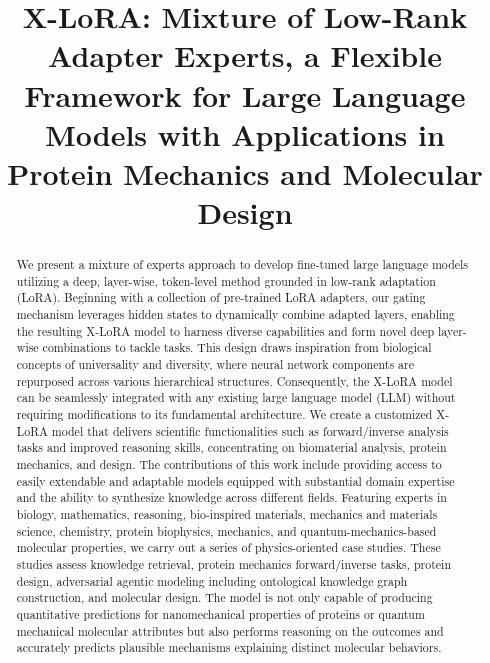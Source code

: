 \title{X-LoRA: Mixture of Low-Rank Adapter Experts, a Flexible Framework for Large Language Models with Applications in Protein Mechanics and Molecular Design}

\begin{abstract}
We present a mixture of experts approach to develop fine-tuned large language models utilizing a deep, layer-wise, token-level method grounded in low-rank adaptation (LoRA). Beginning with a collection of pre-trained LoRA adapters, our gating mechanism leverages hidden states to dynamically combine adapted layers, enabling the resulting X-LoRA model to harness diverse capabilities and form novel deep layer-wise combinations to tackle tasks. This design draws inspiration from biological concepts of universality and diversity, where neural network components are repurposed across various hierarchical structures. Consequently, the X-LoRA model can be seamlessly integrated with any existing large language model (LLM) without requiring modifications to its fundamental architecture. We create a customized X-LoRA model that delivers scientific functionalities such as forward/inverse analysis tasks and improved reasoning skills, concentrating on biomaterial analysis, protein mechanics, and design. The contributions of this work include providing access to easily extendable and adaptable models equipped with substantial domain expertise and the ability to synthesize knowledge across different fields. Featuring experts in biology, mathematics, reasoning, bio-inspired materials, mechanics and materials science, chemistry, protein biophysics, mechanics, and quantum-mechanics-based molecular properties, we carry out a series of physics-oriented case studies. These studies assess knowledge retrieval, protein mechanics forward/inverse tasks, protein design, adversarial agentic modeling including ontological knowledge graph construction, and molecular design. The model is not only capable of producing quantitative predictions for nanomechanical properties of proteins or quantum mechanical molecular attributes but also performs reasoning on the outcomes and accurately predicts plausible mechanisms explaining distinct molecular behaviors.
\end{abstract}

